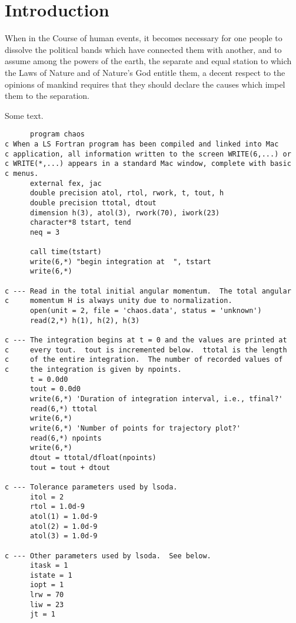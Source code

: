 
\section{Introduction}
When in the Course of human events, it becomes necessary for one people  to dissolve the political bands which have connected them with another,  and to assume among the powers of the earth, the separate and equal station  to which the Laws of Nature and of Nature's God entitle them, a decent respect to the opinions of mankind requires that they should declare  the causes which impel them to the separation.

\pagebreak
Some text.
{\lstset{language=Fortran}
\footnotesize
\begin{lstlisting}
      program chaos
c When a LS Fortran program has been compiled and linked into Mac
c application, all information written to the screen WRITE(6,...) or
c WRITE(*,...) appears in a standard Mac window, complete with basic
c menus.
      external fex, jac
      double precision atol, rtol, rwork, t, tout, h
      double precision ttotal, dtout
      dimension h(3), atol(3), rwork(70), iwork(23)
	  character*8 tstart, tend
      neq = 3
	  
	  call time(tstart)
	  write(6,*) "begin integration at  ", tstart
      write(6,*)
	  
c --- Read in the total initial angular momentum.  The total angular
c     momentum H is always unity due to normalization.
	  open(unit = 2, file = 'chaos.data', status = 'unknown')
      read(2,*) h(1), h(2), h(3)
	  
c --- The integration begins at t = 0 and the values are printed at
c     every tout.  tout is incremented below.  ttotal is the length
c     of the entire integration.  The number of recorded values of
c     the integration is given by npoints.
      t = 0.0d0
      tout = 0.0d0
      write(6,*) 'Duration of integration interval, i.e., tfinal?'
      read(6,*) ttotal
      write(6,*)
      write(6,*) 'Number of points for trajectory plot?'
      read(6,*) npoints
      write(6,*)
      dtout = ttotal/dfloat(npoints)
      tout = tout + dtout
	  
c --- Tolerance parameters used by lsoda.
      itol = 2
      rtol = 1.0d-9
      atol(1) = 1.0d-9
      atol(2) = 1.0d-9
      atol(3) = 1.0d-9
	  
c --- Other parameters used by lsoda.  See below.
      itask = 1
      istate = 1
      iopt = 1
      lrw = 70
      liw = 23
      jt = 1


\end{lstlisting}}
